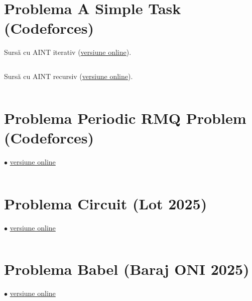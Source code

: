 \documentclass[../main.tex]{subfiles}
\begin{document}
\section{Problema A Simple Task (Codeforces)}
\label{code:a-simple-task}

Sursă cu AINT iterativ (\href{https://codeforces.com/contest/558/submission/341984885}{versiune online}).

\inputminted{cpp}{../src/segment-trees/a-simple-task-iter.cpp}

Sursă cu AINT recursiv (\href{https://codeforces.com/problemset/submission/558/281491775}{versiune online}).

\inputminted{cpp}{../src/segment-trees/a-simple-task-rec.cpp}

\section{Problema Periodic RMQ Problem (Codeforces)}
\label{code:periodic-rmq-problem}
$\bullet$
\href{https://codeforces.com/contest/803/submission/283344703}{versiune online}

\inputminted{cpp}{../src/segment-trees/periodic-rmq-problem.cpp}

\section{Problema Circuit (Lot 2025)}
\label{code:circuit}
$\bullet$
\href{https://kilonova.ro/submissions/769022}{versiune online}

\inputminted{cpp}{../src/segment-trees/circuit.cpp}

\section{Problema Babel (Baraj ONI 2025)}
\label{code:babel}
$\bullet$
\href{https://kilonova.ro/submissions/776880}{versiune online}

\inputminted{cpp}{../src/segment-trees/babel.cpp}
\end{document}
